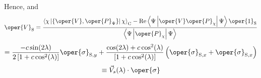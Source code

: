 Hence,
and
\begin{equation}
\oper{V}_{\mathrm{S}}=\frac{\left\langle\chi\left|\left\{\oper{V}, \oper{P}_{\Psi}\right\}\right| \chi\right\rangle_{\mathrm{C}}-\operatorname{Re}\left\langle\Psi\left|\oper{V} \oper{P}_\chi\right| \Psi\right\rangle \oper{1}_{\mathrm{S}}}{\left\langle\Psi\left|\oper{P}_\chi\right| \Psi\right\rangle}
\end{equation}
\begin{equation}
=\frac{-c \sin (2 \lambda)}{2\left[1+c \cos ^2(\lambda)\right]} \oper{\sigma}_{\mathrm{S}, y}+\frac{\cos (2 \lambda)+c \cos ^2(\lambda)}{\left[1+c \cos ^2(\lambda)\right]}\left(\oper{\sigma}_{\mathrm{S}, x}+\oper{\sigma}_{\mathrm{S}, x}\right)
\end{equation}
\begin{equation}
\equiv \vec{V}_s(\lambda) \cdot \oper{\sigma}
\end{equation}
